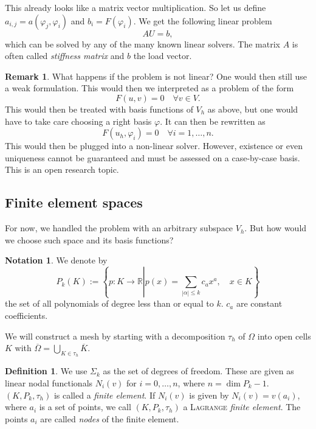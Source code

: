 \documentclass[12pt,a4paper,twoside, open=right]{scrreprt}
\theoremstyle{definition}
\newtheorem{rem}[auf]{Remark}
\newtheorem{defn}[auf]{Definition}
\newtheorem{notation}[auf]{Notation}
\theoremstyle{plain}
\newcommand{\abs}[1]{\left\vert #1\right\vert}
\newcommand{\rr}{\mathbb{R}}
\begin{document}
This already looks like a matrix vector multiplication. So let us define $a_{i,j}=a(\varphi_j,\varphi_i)$ and $b_i=F(\varphi_i)$. We get the following linear problem
\begin{equation}
    AU=b,
\end{equation} which can be solved by any of the many known linear solvers. The matrix $A$ is often called \emph{stiffness matrix} and $b$ the load vector.
\begin{rem}
    What happens if the problem is not linear? One would then still use a weak formulation. This would then we interpreted as a problem of the form
    \begin{equation}
        F(u,v) = 0 \quad\forall v \in V.
    \end{equation}
    This would then be treated with basis functions of $V_h$ as above, but one would have to take care choosing a right basis $\varphi$. It can then be rewritten as 
    \begin{equation}
        F(u_h, \varphi_i) = 0 \quad \forall i=1,\dotsc,n.
    \end{equation}
    This would then be plugged into a non-linear solver. However, existence or even uniqueness cannot be guaranteed and must be assessed on a case-by-case basis. This is an open research topic.
\end{rem}
\subsection{Finite element spaces}
For now, we handled the problem with an arbitrary subspace $V_h$. But how would we choose such space and its basis functions?
\begin{notation}
    We denote by
    \begin{equation}
        P_k(K):=\left\{p\colon K\to\rr\left\vert p(x)=\sum_{\abs{\alpha}\le k}c_ax^a,\right.\quad x\in K\right\}
    \end{equation}
    the set of all polynomials of degree less than or equal to $k$. $c_a$ are constant coefficients.
\end{notation}
We will construct a mesh by starting with a decomposition $\tau_h$ of $\Omega$ into open cells $K$ with $\overline{\Omega}=\bigcup_{K\in\tau_h}\overline{K}$.
\begin{defn}
    We use $\Sigma_k$ as the set of degrees of freedom. These are given as linear nodal functionals $N_i(v)$ for $i=0,\dotsc,n$, where $n= \dim P_k -1$. $(K,P_k,\tau_h)$ is called a \emph{finite element}. If $N_i(v)$ is given by $N_i(v)=v(a_i)$, where $a_i$ is a set of points, we call $(K,P_k,\tau_h)$ a \textsc{Lagrange} \emph{finite element}. The points $a_i$ are called \emph{nodes} of the finite element.
\end{defn}
\end{document}
